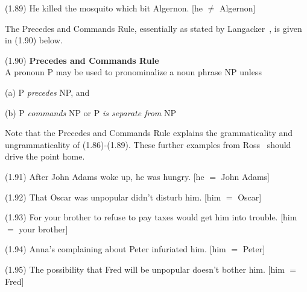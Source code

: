 \documentclass{article}
\begin{document}
\bigbreak
\begin{minipage}{\textwidth}
\begin{enumerate*}
\item[(1.89)] He killed the mosquito which bit Algernon.
[he ${\ne}$ Algernon]
\end{enumerate*}
\bigbreak
\centering
{}
\bigbreak
\vbox{}
\end{minipage}
\bigbreak

The Precedes and Commands Rule, essentially as stated by
Langacker~\cite{Langacker69}, is given in (1.90) below.

\begin{enumerate*}
\item[(1.90)] \textbf{Precedes and Commands Rule}\\
A pronoun P may be used to pronominalize a noun
phrase NP unless
    \begin{enumerate*}
    \item[(a)] P \textit{precedes} NP, and
    \item[(b)] P \textit{commands} NP or P \textit{is separate from} NP
    \end{enumerate*}
\end{enumerate*}

Note that the Precedes and Commands Rule explains the
grammaticality and ungrammaticality of (1.86)-(1.89). These
further examples from Ross~\cite{Ross67} should drive the
point home.

\begin{enumerate*}
\item[(1.91)] After John Adams woke up, he was hungry.
[he ${=}$ John Adams]
\item[(1.92)] That Oscar was unpopular didn't disturb him.
[him ${=}$ Oscar]
\item[(1.93)] For your brother to refuse to pay taxes would
get him into trouble. [him ${=}$ your brother]
\item[(1.94)] Anna's complaining about Peter infuriated him.
[him ${=}$ Peter]
\item[(1.95)] The possibility that Fred will be unpopular
doesn't bother him. [him ${=}$ Fred]
\end{enumerate*}
\end{document}
